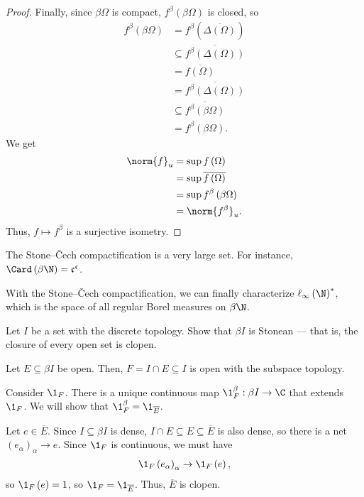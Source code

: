 \documentclass[10pt]{mypackage}
\begin{document}
\begin{proof}
  Finally, since $\beta\Omega$ is compact, $f^{\beta}\left(\beta\Omega\right)$ is closed, so
  \begin{align*}
    f^{\beta}\left(\beta\Omega\right) &= f^{\beta}\left(\overline{\Delta\left(\Omega\right)}\right)\\
                                      &\subseteq \overline{f^{\beta}\left(\Delta\left(\Omega\right)\right)}\\
                                      &= \overline{f\left(\Omega\right)}\\
                                      &= \overline{f^{\beta}\left(\Delta\left(\Omega\right)\right)}\\
                                      &\subseteq \overline{f^{\beta}\left(\beta\Omega\right)}\\
                                      &= f^{\beta}\left(\beta\Omega\right).
  \end{align*}
  We get
  \begin{align*}
    \norm{f}_{u} &= \sup f\left(\Omega\right)\\
                 &= \sup \overline{f\left(\Omega\right)}\\
                 &= \sup f^{\beta}\left(\beta\Omega\right)\\
                 &= \norm{f^{\beta}}_{u}.
  \end{align*}
  Thus, $f \mapsto f^{\beta}$ is a surjective isometry.
\end{proof}
\begin{remark}
  The Stone--Čech compactification is a very large set. For instance, $\Card\left(\beta \N\right) = \mathfrak{c}^{\mathfrak{c}}$.
\end{remark}
\begin{remark}
  With the Stone--Čech compactification, we can finally characterize $\ell_{\infty}\left(\N\right)^{\ast}$, which is the space of all regular Borel measures on $\beta \N$.
\end{remark}
\begin{exercise}
  Let $I$ be a set with the discrete topology. Show that $\beta I$ is Stonean --- that is, the closure of every open set is clopen.
\end{exercise}
\begin{solution}
  Let $E\subseteq \beta I$ be open. Then, $F = I\cap E\subseteq I$ is open with the subspace topology.\newline

  Consider $\1_{F}$. There is a unique continuous map $\1_{F}^{\beta}: \beta I \rightarrow \C$ that extends $\1_{F}$. We will show that $\1_{F}^{\beta} = \1_{\overline{E}}$.\newline

  Let $e\in \overline{E}$. Since $I\subseteq \beta I$ is dense, $I\cap E \subseteq E\subseteq \overline{E}$ is also dense, so there is a net $\left(e_{\alpha}\right)_{\alpha}\rightarrow e$. Since $\1_{F}$ is continuous, we must have
  \begin{align*}
    \1_{F}\left(e_{\alpha}\right)_{\alpha}\rightarrow \1_{F}\left(e\right),
  \end{align*}
  so $\1_{F}\left(e\right) = 1$, so $\1_{F} = \1_{\overline{E}}$. Thus, $\overline{E}$ is clopen.
\end{solution}
\end{document}
